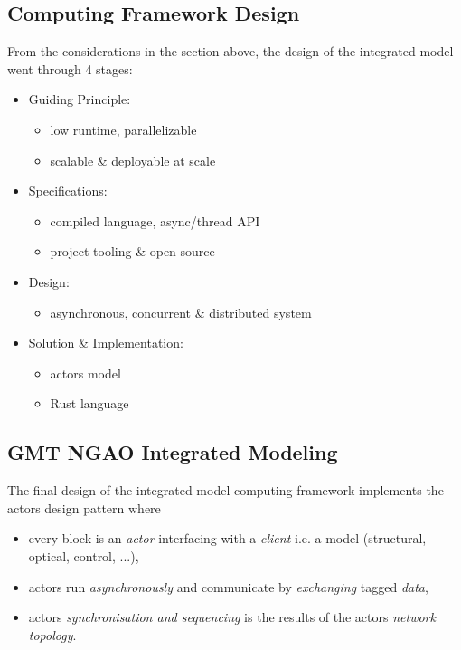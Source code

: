 \documentclass[]{AO4ELT}  %
\begin{document}
\subsection{Computing Framework Design}
\label{sec:framework-design}

From the considerations in the section above, the design of the integrated model
went through 4 stages:
\begin{itemize}
   \item Guiding Principle:
         \begin{itemize}
            \item low runtime, parallelizable
            \item scalable \& deployable at scale
         \end{itemize}
   \item Specifications:
         \begin{itemize}
            \item compiled language, async/thread API
            \item project tooling \& open source
         \end{itemize}
   \item Design:
         \begin{itemize}
            \item asynchronous, concurrent
                  \& distributed system
         \end{itemize}
   \item Solution \& Implementation:
         \begin{itemize}
            \item actors model
            \item Rust language
         \end{itemize}
\end{itemize}

\subsection{GMT NGAO Integrated Modeling}
\label{sec:gmt-ngao-im}

The final design of the integrated model computing framework implements the actors design pattern where
\begin{itemize}
   \item every block is an \emph{actor} interfacing with a \emph{client} i.e. a model (structural, optical, control, ...),
   \item actors run \emph{asynchronously} and communicate by \emph{exchanging} tagged \emph{data},
   \item actors \emph{synchronisation and sequencing} is the results of the actors \emph{network topology}.
\end{itemize}
\end{document}
